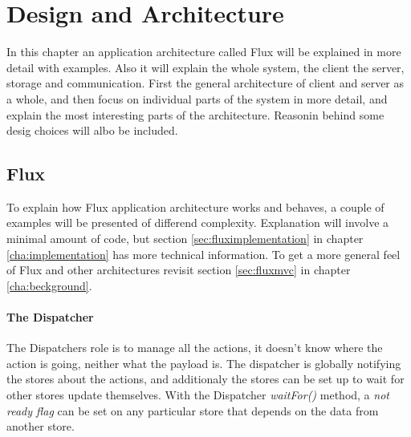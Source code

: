 \chapter{Design and Architecture}
In this chapter an application architecture called Flux will be explained in more detail with examples.  Also it will explain the whole system, the client the server, storage and communication. First the general architecture of client and server as a whole, and then focus on individual parts of the system in more detail, and explain the most interesting parts of the architecture. Reasonin behind some desig choices will albo be included.

\section{Flux}
To explain how Flux application architecture works and behaves, a couple of examples will be presented of differend complexity. Explanation will involve a minimal amount of code, but section \ref{sec:fluximplementation} in chapter \ref{cha:implementation} has more technical information. To get a more general feel of Flux and other architectures revisit section \ref{sec:fluxmvc} in chapter \ref{cha:beckground}.
\subsubsection{The Dispatcher }
The Dispatchers role is to manage all the actions, it doesn't know where the action is going, neither what the payload is. The dispatcher is globally notifying the stores about the actions, and additionaly the stores can be set up to wait for other stores update themselves. With the Dispatcher \emph{waitFor()} method, a \emph{not ready flag} can be set on any particular store that depends on the data from another store. 
